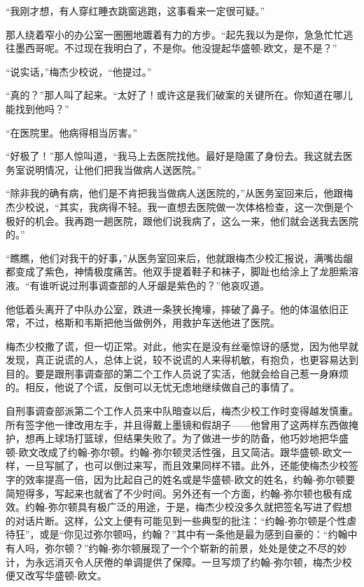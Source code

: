     “我刚才想，有人穿红睡衣跳窗逃跑，这事看来一定很可疑。”

    那人绕着窄小的办公室一圈圈地踱着有力的方步。“起先我以为是你，急急忙忙逃往墨西哥呢。不过现在我明白了，不是你。他没提起华盛顿-欧文，是不是？”

    “说实话，”梅杰少校说，“他提过。”

    “真的？”那人叫了起来。“太好了！或许这是我们破案的关键所在。你知道在哪儿能找到他吗？”

    “在医院里。他病得相当厉害。”

    “好极了！”那人惊叫道，“我马上去医院找他。最好是隐匿了身份去。我这就去医务室说明情况，让他们把我当做病人送医院。”

    “除非我的确有病，他们是不肯把我当做病人送医院的，”从医务室回来后，他跟梅杰少校说，“其实，我病得不轻。我一直想去医院做一次体格检查，这一次倒是个极好的机会。我再跑一趟医院，跟他们说我病了，这么一来，他们就会送我去医院的。”

    “瞧瞧，他们对我干的好事，”从医务室回来后，他就跟梅杰少校汇报说，满嘴齿龈都变成了紫色，神情极度痛苦。他双手提着鞋子和袜子，脚趾也给涂上了龙胆紫溶液。“有谁听说过刑事调查部的人牙龈是紫色的？”他哀叹道。

    他低着头离开了中队办公室，跌进一条狭长掩壕，摔破了鼻子。他的体温依旧正常，不过，格斯和韦斯把他当做例外，用救护车送他进了医院。

    梅杰少校撒了谎，但一切正常。对此，他实在是没有丝毫惊讶的感觉，因为他早就发现，真正说谎的人，总体上说，较不说谎的人来得机敏，有抱负，也更容易达到目的。要是跟刑事调查部的第二个工作人员说了实活，他就会给自己惹一身麻烦的。相反，他说了个谎，反倒可以无忧无虑地继续做自己的事情了。

    自刑事调查部派第二个工作人员来中队暗查以后，梅杰少校工作时变得越发慎重。所有签字他一律改用左手，并且得戴上墨镜和假胡子——他曾用了这两样东西做掩护，想再上球场打篮球，但结果失败了。为了做进一步的防备，他巧妙地把华盛顿-欧文改成了约翰-弥尔顿。约翰-弥尔顿灵活性强，且又简洁。跟华盛顿-欧文一样，一旦写腻了，也可以倒过来写，而且效果同样不错。此外，还能使梅杰少校签字的效率提高一倍，因为比起自己的姓名或是华盛顿-欧文的姓名，约翰-弥尔顿要简短得多，写起来也就省了不少时间。另外还有一个方面，约翰-弥尔顿也极有成效。约翰-弥尔顿具有极广泛的用途，于是，梅杰少校没多久就把签名写进了假想的对话片断。这样，公文上便有可能见到一些典型的批注：“约翰-弥尔顿是个性虐待狂”，或是“你见过弥尔顿吗，约翰？”其中有一条他是最为感到自豪的：“约翰中有人吗，弥尔顿？”约翰-弥尔顿展现了一个个崭新的前景，处处是使之不尽的妙计，为永远消灭令人厌倦的单调提供了保障。一旦写烦了约翰-弥尔顿，梅杰少校便又改写华盛顿-欧文。

